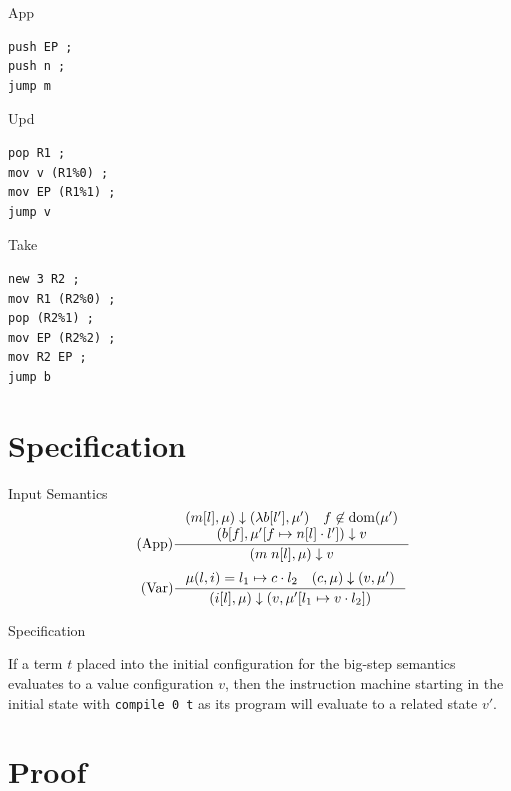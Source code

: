 \documentclass[17pt]{beamer}
\begin{document}
\begin{frame}[fragile]{App}
\begin{lstlisting}
push EP ;
push n ;
jump m 
\end{lstlisting}
\end{frame}

\begin{frame}[fragile]{Upd}
\begin{lstlisting}
pop R1 ;
mov v (R1%0) ;
mov EP (R1%1) ;
jump v 
\end{lstlisting}
\end{frame}

\begin{frame}[fragile]{Take}
\begin{lstlisting}
new 3 R2 ;
mov R1 (R2%0) ;
pop (R2%1) ;
mov EP (R2%2) ;
mov R2 EP ;
jump b
\end{lstlisting}
\end{frame}

\section{Specification}
\begin{frame}{Input Semantics}
\begin{align*}
\tag{App} \inference
{(m[l], \mu) \downarrow (\lambda b[l'], \mu') \quad f \not \in \textnormal{dom}(\mu') \\ 
(b[f], \mu'[f \mapsto n[l] \cdot l']) \downarrow v}
{(m \; n[l], \mu) \downarrow v}  
\end{align*}
\begin{align*}
\tag{Var} \inference
{\mu(l, i) = l_1 \mapsto c \cdot l_2 \quad (c, \mu) \downarrow (v, \mu')}
{(i[l],\mu) \downarrow (v, \mu'[l_1 \mapsto v \cdot l_2])}
\end{align*}
\end{frame}

\begin{frame}{Specification}
\begin{theorem} 
If a term $t$ placed into the initial configuration for the big-step semantics
evaluates to a value configuration $v$, then the instruction machine starting
in the initial state with \texttt{compile 0 t} as its program will evaluate to a
related state $v'$.  
\end{theorem}
\end{frame}

\section{Proof}
\end{document}

